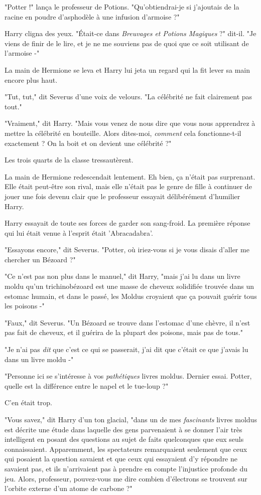 "Potter !" lança le professeur de Potions. "Qu'obtiendrai-je si j'ajoutais de la racine en poudre d'asphodèle à une infusion d'armoise ?"

Harry cligna des yeux. "Était-ce dans \emph{Breuvages et Potions Magiques}  ?" dit-il. "Je viens de finir de le lire, et je ne me souviens pas de quoi que ce soit utilisant de l'armoise -"

La main de Hermione se leva et Harry lui jeta un regard qui la fit lever sa main encore plus haut.

"Tut, tut," dit Severus d'une voix de velours. "La célébrité ne fait clairement pas tout."

"Vraiment," dit Harry. "Mais vous venez de nous dire que vous nous apprendrez à mettre la célébrité en bouteille. Alors dites-moi, \emph{comment}  cela fonctionne-t-il exactement ? On la boit et on devient une célébrité ?"

Les trois quarts de la classe tressautèrent.

La main de Hermione redescendait lentement. Eh bien, ça n'était pas surprenant. Elle était peut-être son rival, mais elle n'était pas le genre de fille à continuer de jouer une fois devenu clair que le professeur essayait délibérément d'humilier Harry.

Harry essayait de toute ses forces de garder son sang-froid. La première réponse qui lui était venue à l'esprit était 'Abracadabra'.

"Essayons encore," dit Severus. "Potter, où iriez-vous si je vous disais d'aller me chercher un Bézoard ?"

"Ce n'est pas non plus dans le manuel," dit Harry, "mais j'ai lu dans un livre moldu qu'un trichinobézoard est une masse de cheveux solidifiée trouvée dans un estomac humain, et dans le passé, les Moldus croyaient que ça pouvait guérir tous les poisons -"

"Faux," dit Severus. "Un Bézoard se trouve dans l'estomac d'une chèvre, il n'est pas fait de cheveux, et il guérira de la plupart des poisons, mais pas de tous."

"Je n'ai pas \emph{dit}  que c'est ce qui se passerait, j'ai dit que c'était ce que j'avais lu dans un livre moldu -"

"Personne ici se s'intéresse à vos \emph{pathétiques}  livres moldus. Dernier essai. Potter, quelle est la différence entre le napel et le tue-loup ?"

C'en était trop.

"Vous savez," dit Harry d'un ton glacial, "dans un de mes \emph{fascinants}  livres moldus est décrite une étude dans laquelle des gens parvenaient à se donner l'air très intelligent en posant des questions au sujet de faits quelconques que eux seuls connaissaient. Apparemment, les spectateurs remarquaient seulement que ceux qui posaient la question savaient et que ceux qui essayaient d'y répondre ne savaient pas, et ils n'arrivaient pas à prendre en compte l'injustice profonde du jeu. Alors, professeur, pouvez-vous me dire combien d'électrons se trouvent sur l'orbite externe d'un atome de carbone ?"

